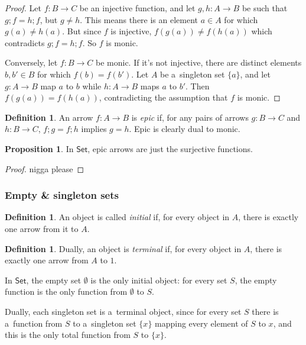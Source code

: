 \documentclass{amsart}
\theoremstyle{definition}
\newtheorem{definition}[thm]{Definition}
\newtheorem{proposition}[thm]{Proposition}
\newcommand{\cat}[1]{\mathsf{#1}} %
\renewcommand{\emph}{\textit} %
\begin{document}
\begin{proof}
  Let $f: B\to C$ be an injective function, and let $g,h: A\to B$ be such that $g;\! f = h;\! f$, but $g\neq h$. This means there is an element $a\in A$ for which $g(a) \neq h(a)$. But since $f$ is injective, $f(g(a))\neq f(h(a))$ which contradicts $g;\! f = h;\! f$. So $f$ is monic.

  Conversely, let $f: B \to C$ be monic. If it's not injective, there are distinct elements $b, b' \in B$ for which $f(b) = f(b')$. Let $A$ be a~singleton set $\{a\}$, and let $g: A\to B$ map $a$ to $b$ while $h: A\to B$ maps $a$ to $b'$. Then $f(g(a)) = f(h(a))$, contradicting the assumption that $f$ is monic. 
\end{proof}

\begin{definition}
An arrow $f: A\to B$ is \emph{epic} if, for any pairs of arrows $g: B\to C$ and $h: B\to C$, $f;\! g = f;\! h$ implies $g=h$. Epic is clearly dual to monic. 
\end{definition}

\begin{proposition}
In $\cat{Set}$, epic arrows are just the surjective functions. 
\end{proposition}

\begin{proof}
  nigga please
\end{proof}

\subsubsection{Empty \& singleton sets}

\begin{definition}
An object is called \emph{initial} if, for every object in $A$, there is exactly one arrow from it to $A$. 
\end{definition}

\begin{definition}
Dually, an object is \emph{terminal} if, for every object in $A$, there is exactly one arrow from $A$ to $1$. 
\end{definition}

In $\cat{Set}$, the empty set $\emptyset$ is the only initial object: for every set $S$, the empty function is the only function from $\emptyset$ to $S$.

Dually, each singleton set is a~terminal object, since for every set $S$ there is a~function from $S$ to a~singleton set $\{x\}$ mapping every element of $S$ to $x$, and this is the only total function from $S$ to $\{x\}$. 
\end{document}
